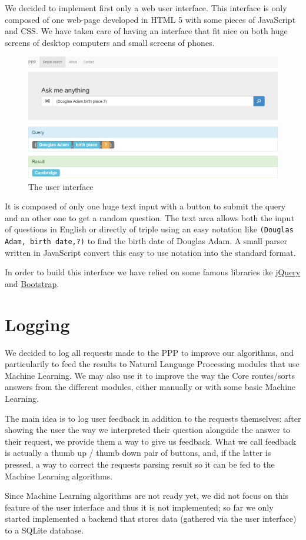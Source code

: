 We decided to implement first only a web user interface. This interface
is only composed of one web-page developed in HTML 5 with some
pieces of JavaScript and CSS. We have taken care of having an
interface that fit nice on both huge screens of desktop computers
and small screens of phones.

\begin{figure}[!ht]
    \centering
    \includegraphics[scale=0.35]{WebUI.png}
    \caption{The user interface}
\end{figure}

It is composed of only one huge text input with a button to submit
the query and an other one to get a random question. The text area
allows both the input of questions in English or directly of triple using
an easy notation like \texttt{(Douglas Adam, birth date,?)} to find the
birth date of Douglas Adam. A small parser written in JavaScript convert
this easy to use notation into the standard format.

In order to build this interface we have relied on some famous libraries 
ike \href{http://jquery.com/}{jQuery} and \href{http://getbootstrap.com/}{Bootstrap}.

\section{Logging}

We decided to log all requests made to the PPP to improve our algorithms,
and particularily to feed the results to Natural Language Processing
modules that use Machine Learning.
We may also use it to improve the way the Core routes/sorts answers
from the different modules, either manually or with some basic
Machine Learning.

The main idea is to log user feedback in addition to the requests
themselves: after showing the user the way we interpreted their
question alongside the answer to their request, we provide them a
way to give us feedback.
What we call feedback is actually a thumb up / thumb down pair of
buttons, and, if the latter is pressed, a way to correct the requests
parsing result so it can be fed to the Machine Learning algorithms.

Since Machine Learning algorithms are not ready yet, we did not focus
on this feature of the user interface and thus it is not implemented;
so far we only started implemented a backend that stores data
(gathered via the user interface) to a SQLite database.
